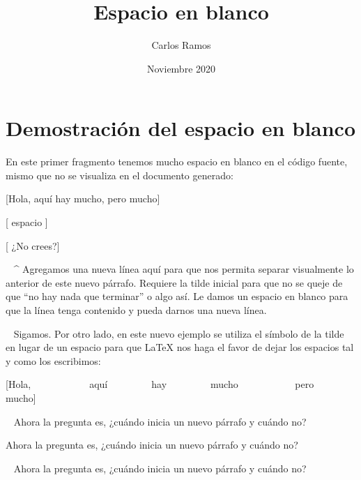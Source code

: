 \documentclass{article}
\title{Espacio en blanco}
\author{Carlos Ramos}
\date{Noviembre 2020}
\begin{document}
\maketitle

\section{Demostración del espacio en blanco}

En este primer fragmento tenemos mucho espacio en blanco en el código fuente, mismo que no se visualiza en el documento generado:

[Hola,            aquí         hay         mucho,          	
pero mucho]       			
        	
           		
[           espacio                    ]
       	
            	
                    	
[				¿No crees?]   	

~\newline
\indent \^{} Agregamos una nueva línea aquí para que nos permita separar visualmente lo anterior de este nuevo párrafo. Requiere la tilde inicial para que no se queje de que ``no hay nada que terminar'' o algo así. Le damos un espacio en blanco para que la línea tenga contenido y pueda darnos una nueva línea.

~\newline
Sigamos. Por otro lado, en este nuevo ejemplo se utiliza el símbolo de la tilde en lugar de un espacio para que \LaTeX{} nos haga el favor de dejar los espacios tal y como los escribimos:

[Hola,~~~~~~~~~~~~aquí~~~~~~~~~hay~~~~~~~~~mucho~~~~~~~~~~~
pero mucho]~~~~~~~~~~~~~~~~~
\newline\newline
[~~~~~~~~~~~espacio~~~~~~~~~~~~~~~~~~~~]
\newline
\newline
[~~~~~~~~~~~~~~~~¿No crees?]


~\newline
Ahora la pregunta es, ¿cuándo inicia un nuevo párrafo y cuándo no?


Ahora la pregunta es, ¿cuándo inicia un nuevo párrafo y cuándo no?

~\newline
\indent Ahora la pregunta es, ¿cuándo inicia un nuevo párrafo y cuándo no?
\end{document}

